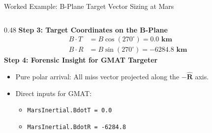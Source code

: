 \documentclass[aspectratio=169, 10pt]{beamer}
\begin{document}
\begin{frame}{Worked Example: B-Plane Target Vector Sizing at Mars}
\begin{columns}[t]
        \begin{column}{0.48\textwidth}
            \scriptsize
            \textbf{Step 3: Target Coordinates on the B-Plane}
            \begin{align*}
                B\cdot T &= B \cos(270^\circ) = \mathbf{0.0\text{ km}} \\
                B\cdot R &= B \sin(270^\circ) = \mathbf{-6284.8\text{ km}}
            \end{align*}
            \textbf{Step 4: Forensic Insight for GMAT Targeter}
            \begin{itemize}\setlength{\itemsep}{1pt}
                \item Pure polar arrival: All miss vector projected along the $-\hat{\mathbf{R}}$ axis.
                \item Direct inputs for GMAT:
                \begin{itemize}
                    \item \texttt{MarsInertial.BdotT = 0.0}
                    \item \texttt{MarsInertial.BdotR = -6284.8}
                \end{itemize}
            \end{itemize}
        \end{column}
    \end{columns}
\end{frame}
\end{document}
